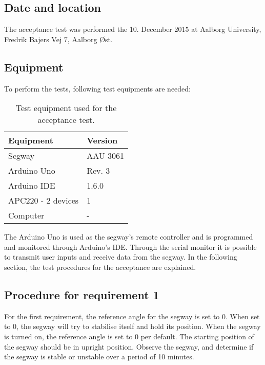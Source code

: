 \subsection{Date and location}
The acceptance test was performed the 10. December 2015 at Aalborg University, Fredrik Bajers Vej 7, Aalborg Øst.
\subsection{Equipment}
To perform the tests, following test equipments are needed:
\begin{table}[H] \centering
\begin{tabular}{|l|l|} 
\hline 
\textbf{Equipment} & \textbf{Version} \\ 
\hline 
Segway & AAU 3061 \\ 
\hline 
Arduino Uno & Rev. 3 \\ 
\hline 
Arduino IDE & 1.6.0 \\ 
\hline 
APC220 - 2 devices & 1 \\ 
\hline 
Computer & - \\ 
\hline 
\end{tabular} 
\caption{Test equipment used for the acceptance test.}
\label{tab:test_equipment}
\end{table}
The Arduino Uno is used as the segway's remote controller and is programmed and monitored through Arduino's IDE. Through the serial monitor it is possible to transmit user inputs and receive data from the segway.
In the following section, the test procedures for the acceptance are explained. 

\subsection{Procedure for requirement 1}
For the first requirement, the reference angle for the segway is set to 0. When set to 0, the segway will try to stabilise itself and hold its position. When the segway is turned on, the reference angle is set to 0 per default. The starting position of the segway should be in upright position. Observe the segway, and determine if the segway is stable or unstable over a period of 10 minutes.

